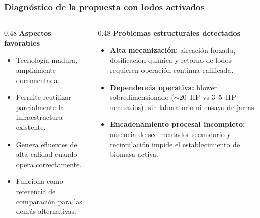 \documentclass[aspectratio=169]{beamer}
\begin{document}
\begin{frame}
\end{frame}


\begin{frame}
\frametitle{Diagn\'{o}stico de la propuesta con lodos activados}
\begin{columns}[T]
\begin{column}{0.48\textwidth}
\textbf{Aspectos favorables}\\[4pt]
\footnotesize
\begin{itemize}
\item Tecnolog\'{i}a madura, ampliamente documentada.
\item Permite reutilizar parcialmente la infraestructura existente.
\item Genera efluentes de alta calidad cuando opera correctamente.
\item Funciona como referencia de comparaci\'{o}n para las dem\'{a}s alternativas.
\end{itemize}
\end{column}
\begin{column}{0.48\textwidth}
\textbf{Problemas estructurales detectados}\\[4pt]
\footnotesize
\begin{itemize}
\item \textcolor{rojomalo}{\textbf{Alta mecanizaci\'{o}n:}} aireaci\'{o}n forzada, dosificaci\'{o}n qu\'{i}mica y retorno de lodos requieren operaci\'{o}n continua calificada.
\item \textcolor{rojomalo}{\textbf{Dependencia operativa:}} blower sobredimensionado ($\sim$20~HP vs 3--5~HP necesarios); sin laboratorio ni ensayo de jarras.
\item \textcolor{rojomalo}{\textbf{Encadenamiento procesal incompleto:}} ausencia de sedimentador secundario y recirculaci\'{o}n impide el establecimiento de biomasa activa.
\end{itemize}
\end{column}
\end{columns}
\end{frame}
\end{document}
